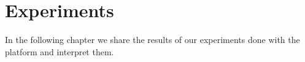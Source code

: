 \documentclass[class=article, crop=false]{standalone}
\begin{document}
\chapter{Experiments}\label{cha:exp}

In the following chapter we share the results of our experiments done with the platform and interpret them.



\end{document}
